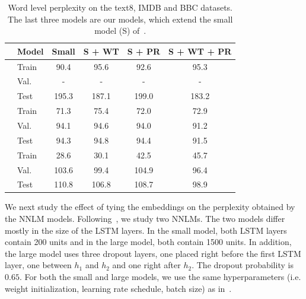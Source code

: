 \documentclass[11pt]{article}
\begin{document}
\begin{table}[t]

\tabcolsep=0.11cm
\begin{center}
\begin{small}
%
%
%
%
%
%
%
%
%
\begin{tabular}{l|l|c|ccc}
\hline
      & Model   & Small & S + WT & S + PR & S + WT + PR \\ \hline
\parbox[t]{2mm}{} 
      & Train & 90.4 &   95.6     &  92.6      &  95.3            \\ 
      & Val.  &  -  &      -   &      -    &     -          \\ 
      & Test  &  195.3  &   187.1     &   199.0 &  183.2           \\ \hline
\parbox[t]{2mm}{}  
      & Train  &  71.3  & 75.4        &   72.0   & 72.9              \\ 
      & Val.   &  94.1  & 94.6        &  94.0      &  91.2          \\ 
      & Test   &  94.3  & 94.8      &  94.4     &  91.5         \\ \hline
\parbox[t]{2mm}{}   
      & Train  &  28.6     &    30.1        & 42.5           &    45.7     \\ 
      & Val.   & 103.6      &   99.4      &   104.9     &96.4                 \\ 
      & Test   &  110.8     & 106.8           & 108.7            &   98.9              \\ \hline
\end{tabular}
\end{small}
\end{center}
\caption{\small Word level perplexity on the text8, IMDB and BBC datasets. The last three models are our models, which extend the small model (S) of~\protect\cite{zaremba14}.} %
\label{tab:lm-text8-no-do}
\end{table}
We next study the effect of tying the embeddings on the perplexity obtained by the NNLM models. Following~\cite{zaremba14}, we study two NNLMs. The two models differ mostly in the size of the LSTM layers. In the small model, both LSTM layers contain 200 units and in the large model, both contain 1500 units. In addition, the large model uses three dropout layers, one placed right before the first LSTM layer, one between $h_1$ and $h_2$ and one right after $h_2$. The dropout probability is $0.65$. 
For both the small and large models, we use the same hyperparameters (i.e. weight initialization, learning rate schedule, batch size) as in~\cite{zaremba14}.
\end{document}
